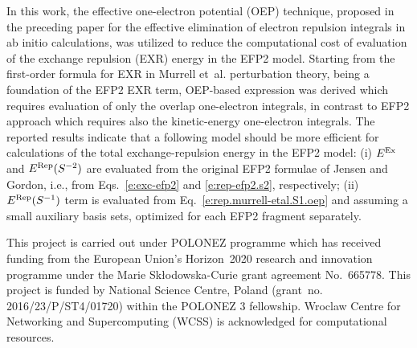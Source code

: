 In this work, the effective one-electron potential (OEP) technique,
proposed in the preceding paper for the
effective elimination of electron
repulsion integrals in ab initio calculations,
was utilized to reduce the computational cost
of evaluation of the exchange repulsion (EXR) energy in the EFP2 model.
Starting from the first-order formula for EXR in Murrell et~al. perturbation theory, 
being a foundation of the EFP2 EXR term,
OEP\hyp{}based expression was derived which requires evaluation of
only the overlap one-electron integrals, in contrast to EFP2
approach which requires also the kinetic-energy one-electron
integrals. 
The reported results indicate that a following model should be more
efficient for calculations of the 
total exchange\hyp{}repulsion energy in the EFP2 model: 
(i) $E^{\rm Ex}$ and $E^{\rm Rep}(S^{-2})$ are evaluated
from the original EFP2 formulae of Jensen and Gordon, i.e.,
from Eqs.~\eqref{e:exc-efp2} and \eqref{e:rep-efp2.s2}, respectively;
(ii) $E^{\rm Rep}(S^{-1})$ term is evaluated from Eq.~\eqref{e:rep.murrell-etal.S1.oep}
and assuming a small auxiliary basis sets, optimized for each
EFP2 fragment separately.


\begin{acknowledgments}
This project is carried out under POLONEZ programme which has received funding from the European Union's
Horizon~2020 research and innovation programme under the Marie Sk{\l}odowska-Curie grant agreement 
No.~665778. This project is funded by National Science Centre, Poland 
(grant~no. 2016/23/P/ST4/01720) within the POLONEZ 3 fellowship.
Wroclaw Centre for Networking and Supercomputing (WCSS) is acknowledged for
computational resources.
\end{acknowledgments}






